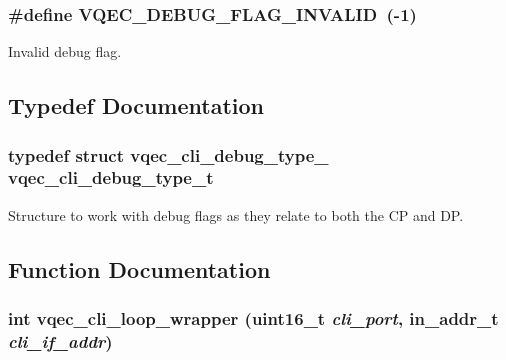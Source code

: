 \subsubsection{\setlength{\rightskip}{0pt plus 5cm}\#define VQEC\_\-DEBUG\_\-FLAG\_\-INVALID~(-1)}\label{vqec__cli__register_8h_522bc1ccb82472e1417d74ac09196d44}


Invalid debug flag. 

\subsection{Typedef Documentation}
\subsubsection{\setlength{\rightskip}{0pt plus 5cm}typedef struct \bf{vqec\_\-cli\_\-debug\_\-type\_\-}  \bf{vqec\_\-cli\_\-debug\_\-type\_\-t}}\label{vqec__cli__register_8h_7ea15cd750fa0e91ff562e8226834680}


Structure to work with debug flags as they relate to both the CP and DP. 

\subsection{Function Documentation}
\subsubsection{\setlength{\rightskip}{0pt plus 5cm}int vqec\_\-cli\_\-loop\_\-wrapper (uint16\_\-t {\em cli\_\-port}, in\_\-addr\_\-t {\em cli\_\-if\_\-addr})}\label{vqec__cli__register_8h_c633b1929d242adb624a6b087aca273b}


